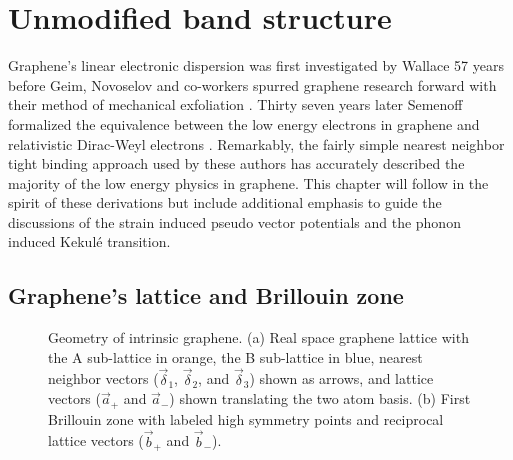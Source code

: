 \chapter{Unmodified band structure\label{chap:TB}}

Graphene's linear electronic dispersion was first investigated by Wallace \cite{Wallace1947} 57 years before Geim, Novoselov and co-workers spurred graphene research forward with their method of mechanical exfoliation \cite{Novoselov2004}.
Thirty seven years later Semenoff formalized the equivalence between the low energy electrons in graphene and relativistic Dirac-Weyl electrons \cite{Semenoff1984}.
Remarkably, the fairly simple nearest neighbor tight binding approach used by these authors has accurately described the majority of the low energy physics in graphene.
This chapter will follow in the spirit of these derivations but include additional emphasis to guide the discussions of the strain induced pseudo vector potentials and the phonon induced Kekul\'e transition.

\section{Graphene's lattice and Brillouin zone}
\begin{figure}
	\begin{center}
	
	\end{center}
	\caption[Geometry of intrinsic graphene]{\label{fig:TB:geometry} Geometry of intrinsic graphene.  (a) Real space graphene lattice with the A sub-lattice in orange, the B sub-lattice in blue, nearest neighbor vectors ($\vec \delta_1$, $\vec \delta_2$, and $\vec \delta_3$) shown as arrows, and lattice vectors ($\vec a_+$ and $\vec a_-$) shown translating the two atom basis. (b) First Brillouin zone with labeled high symmetry points and reciprocal lattice vectors ($\vec{b}_+$ and $\vec{b}_-$).}
\end{figure}

